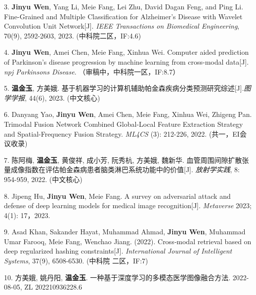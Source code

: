 \begin{publications}{99}
\item[3.]
\textbf{Jinyu Wen}, Yang Li, Meie Fang, Lei Zhu, David Dagan Feng, and Ping Li. Fine-Grained and Multiple Classification for Alzheimer's Disease with Wavelet Convolution Unit Network[J]. \textit{IEEE Transactions on Biomedical Engineering}, 70(9), 2592-2603, 2023.  (中科院二区，IF:4.6)

\item[4.]
\textbf{Jinyu Wen}, Amei Chen, Meie Fang, Xinhua Wei. Computer aided prediction of Parkinson's disease progression by machine learning from cross-modal data[J]. \textit{npj Parkinsons Disease}. （审稿中，中科院一区，IF:8.7）

\item[5.]
\textbf{温金玉}, 方美娥. 基于机器学习的计算机辅助帕金森疾病分类预测研究综述[J].\textit{图学学报}, 44(6), 2023. (中文核心)

\item[6.]
Danyang Yao, \textbf{Jinyu Wen}, Amei Chen, Meie Fang, Xinhua Wei, Zhigeng Pan. Trimodal Fusion Network Combined Global-Local Feature Extraction Strategy and Spatial-Frequency Fusion Strategy. \textit{ML4CS} (3): 212-226, 2022.  (共一，EI会议收录)

\item[7.]
陈阿梅, \textbf{温金玉}, 黄俊祥, 成小芳, 阮秀杭, 方美娥, 魏新华. 血管周围间隙扩散张量成像指数在评估帕金森病患者脑类淋巴系统功能中的价值[J]. \textit{放射学实践}, 8: 954-959, 2022. (中文核心)

\item[8.]
Jipeng Hu, \textbf{Jinyu Wen}, Meie Fang. A survey on adversarial attack and defense of deep learning models for medical image recognition[J]. \textit{Metaverse} 2023; 4(1): 17，2023. 

\item[9.]
Asad Khan, Sakander Hayat, Muhammad Ahmad, \textbf{Jinyu Wen}, Muhammad Umar Farooq, Meie Fang, Wenchao Jiang. (2022). Cross‐modal retrieval based on deep regularized hashing constraints[J]. \textit{International Journal of Intelligent Systems}, 37(9), 6508-6530. (中科院 二区，IF:7)


\item[10.]
方美娥, 姚丹阳, \textbf{温金玉}. 一种基于深度学习的多模态医学图像融合方法. 2022-08-05, ZL 202210936228.6




\end{publications}
